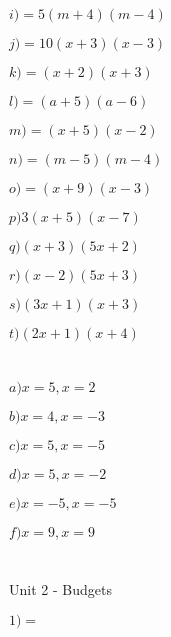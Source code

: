\documentclass{article}
\begin{document}
$i) = 5( m + 4) (m - 4)$

$j) = 10(x + 3) (x - 3)$

$k) = (x + 2) ( x + 3)$

$l) = (a + 5) (a - 6)$

$m) = (x + 5) (x - 2)$

$n) = (m - 5) (m - 4)$

$o) = (x + 9) (x - 3)$

$p) 3(x + 5) (x - 7)$

$q) (x + 3) (5x + 2)$

$r) (x - 2) (5x + 3)$

$s) (3x + 1) ( x + 3)$

$t) (2x + 1) (x + 4)$

\section{}

$a) x = 5, x = 2$

$b) x = 4, x = -3$

$c) x = 5, x = -5$

$d) x = 5, x = -2$

$e) x = -5, x = -5$

$f) x = 9, x = 9$

\section{}

Unit 2 - Budgets

$1) =   $
\end{document}
